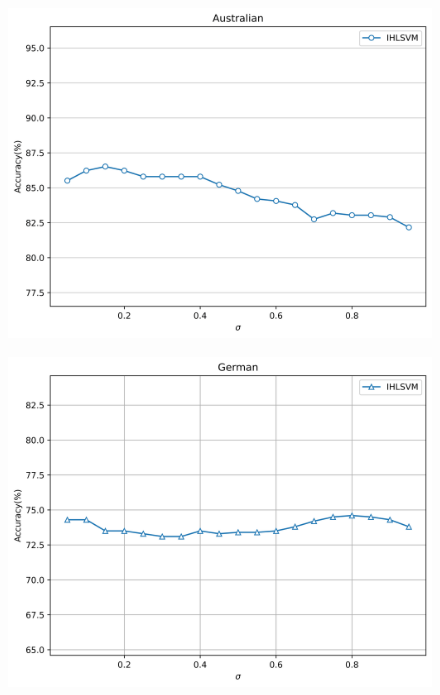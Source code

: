 \documentclass[12pt,a4paper,oneside,english]{report}
\begin{document}
  \begin{figure}[t!] %
    \centering
    \begin{minipage}[t]{0.5\textwidth}
        \centering
        \includegraphics[width=0.9\linewidth]{Figures/chp4/ablation/aus_sigma.pdf}
    \end{minipage}%
    \begin{minipage}[t]{0.5\textwidth}
        \centering
        \includegraphics[width=0.9\linewidth]{Figures/chp4/ablation/german_sigma.pdf}
        \label{fig:german_kernel}
    \end{minipage}
    \vspace{0.5cm} %


\end{figure}
\end{document}
